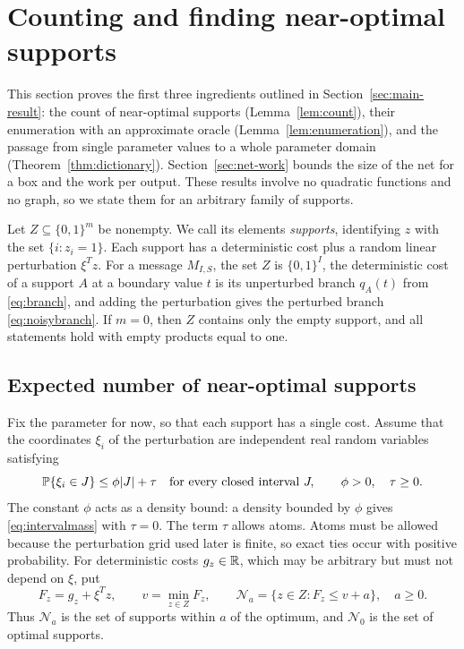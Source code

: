 \section{Counting and finding near-optimal supports}
\label{sec:enumeration}
This section proves the first three ingredients outlined in
Section~\ref{sec:main-result}: the count of near-optimal supports
(Lemma~\ref{lem:count}), their enumeration with an approximate oracle
(Lemma~\ref{lem:enumeration}), and the passage from single parameter
values to a whole parameter domain (Theorem~\ref{thm:dictionary}).
Section~\ref{sec:net-work} bounds the size of the net for a box and the
work per output. These results involve no quadratic functions and no
graph, so we state them for an arbitrary family of supports.

Let $Z\subseteq\{0,1\}^m$ be nonempty. We call its elements
\emph{supports}, identifying $z$ with the set $\{i:z_i=1\}$. Each support
has a deterministic cost plus a random linear perturbation $\xi^Tz$. For
a message $M_{I,S}$, the set $Z$ is $\{0,1\}^I$, the deterministic cost
of a support $A$ at a boundary value $t$ is its unperturbed branch
$q_A(t)$ from \eqref{eq:branch}, and adding the perturbation gives the
perturbed branch \eqref{eq:noisybranch}. If $m=0$, then $Z$ contains
only the empty support, and all statements hold with empty products
equal to one.

\subsection{Expected number of near-optimal supports}
Fix the parameter for now, so that each support has a single cost.
Assume that the coordinates $\xi_i$ of the perturbation are independent
real random variables satisfying
\begin{equation}\label{eq:intervalmass}
 \mathbb P\{\xi_i\in J\}\le\phi |J|+\tau
 \quad\text{for every closed interval }J,
 \qquad \phi>0,\quad\tau\ge0.
\end{equation}
The constant $\phi$ acts as a density bound: a density bounded by $\phi$
gives \eqref{eq:intervalmass} with $\tau=0$. The term $\tau$ allows
atoms. Atoms must be allowed because the perturbation grid used later is
finite, so exact ties occur with positive probability. For deterministic
costs $g_z\in\mathbb R$, which may be arbitrary but must not depend on $\xi$,
put
\[
 F_z=g_z+\xi^Tz,\qquad v=\min_{z\in Z}F_z,\qquad
 \mathcal N_a=\{z\in Z:F_z\le v+a\},\quad a\ge0.
\]
Thus $\mathcal N_a$ is the set of supports within $a$ of the optimum,
and $\mathcal N_0$ is the set of optimal supports.

